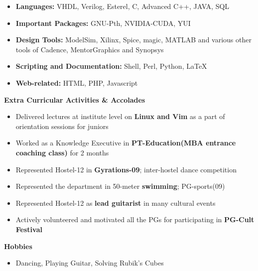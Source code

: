 \documentclass[a4paper,11pt,times]{res}
\newcommand{\smalitem}[1]{\item #1 \vspace{-4pt}}
\newcommand{\resheading}[1]{{\large \colorbox{mygrey}{\begin{minipage}{\textwidth}{\textbf{#1 \vphantom{p\^{E}}}}\end{minipage}}\vspace{4pt}}}
\begin{document}
\begin{itemize}
\smalitem{{\bf Languages:}
VHDL, Verilog, Esterel, C, Advanced C++, JAVA, SQL}

\smalitem{{\bf Important Packages:}
 GNU-Pth, NVIDIA-CUDA, YUI}

\smalitem{{\bf Design Tools:}
ModelSim, Xilinx, Spice, magic, MATLAB and various other tools of Cadence, MentorGraphics and Synopsys }
\smalitem{{\bf Scripting and Documentation:} Shell, Perl, Python, \LaTeX}
\smalitem{{\bf Web-related:} HTML, PHP, Javascript}
\end{itemize}

\resheading{Extra Curricular Activities \& Accolades}
\begin{itemize}
\smalitem {Delivered lectures at institute level on {\bf Linux and Vim} as a part of orientation sessions for juniors } 
\smalitem { Worked as a Knowledge Executive in {\bf {PT-Education}(MBA entrance coaching class)} for 2 months}
\smalitem {Represented Hostel-12 in {\bf Gyrations-09}; inter-hostel dance competition}
\smalitem {Represented the department in 50-meter {\bf swimming}; PG-sports(09)}
\smalitem {Represented Hostel-12 as {\bf lead guitarist} in many cultural events}
\smalitem {Actively volunteered and motivated all the PGs for participating in {\bf PG-Cult Festival}}
\end{itemize}

\resheading {Hobbies}
\begin{itemize}
\smalitem{ Dancing, Playing Guitar, Solving Rubik's Cubes}
\end{itemize}
\end{document}

